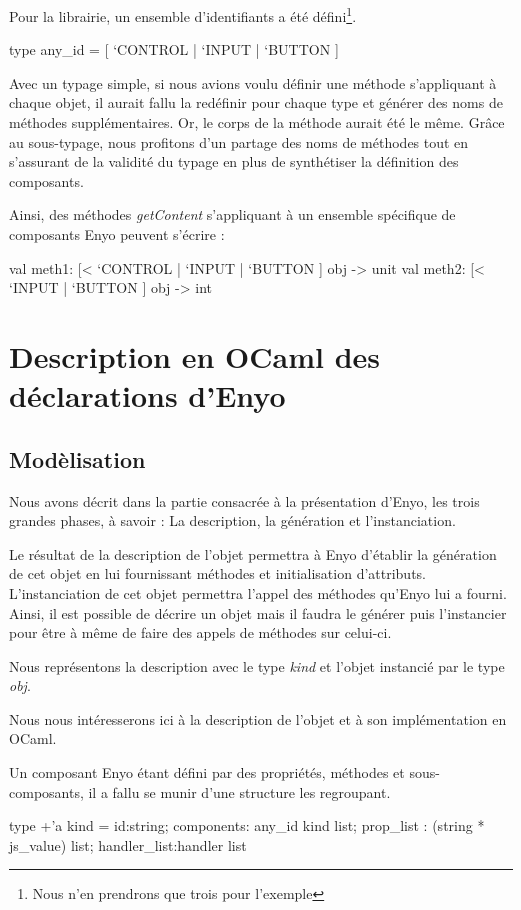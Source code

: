 \documentclass[11pt,a4paper]{report}
\begin{document}
Pour la librairie, un ensemble d'identifiants a été défini\footnote{Nous n'en prendrons que 
trois pour l'exemple}.

\begin{OCaml}
  type any_id = [ `CONTROL | `INPUT | `BUTTON ]
\end{OCaml}

Avec un typage simple, si nous avions voulu définir une méthode s'appliquant à chaque objet, il aurait
fallu la redéfinir pour chaque type et générer des noms de méthodes supplémentaires. 
Or, le corps de la méthode aurait été le même. 
Grâce au sous-typage, nous profitons d'un partage des noms de méthodes tout en s'assurant de la validité
du typage en plus de synthétiser la définition des composants.

Ainsi, des méthodes \emph{getContent} s'appliquant à un ensemble spécifique de composants Enyo
peuvent s'écrire :
\begin{OCaml}
  val meth1: [< `CONTROL | `INPUT | `BUTTON ] obj -> unit
  val meth2: [< `INPUT | `BUTTON ] obj -> int
\end{OCaml}

\section{Description en OCaml des déclarations d'Enyo}
\subsection{Modèlisation}

Nous avons décrit dans la partie consacrée à la présentation d'Enyo, les trois grandes phases, à savoir :
La description, la génération et l'instanciation.

Le résultat de la description de l'objet permettra à Enyo d'établir la génération de cet objet en lui
fournissant méthodes et initialisation d'attributs. L'instanciation de cet objet permettra l'appel
des méthodes qu'Enyo lui a fourni. Ainsi, il est possible de décrire un objet mais il faudra
le générer puis l'instancier pour être à même de faire des appels de méthodes sur celui-ci.

Nous représentons la description avec le type \emph{kind} et l'objet instancié par le type \emph{obj}.

Nous nous intéresserons ici à la description de l'objet et à son implémentation en OCaml.

Un composant Enyo étant défini par des propriétés, méthodes et sous-composants, il a fallu se munir
d'une structure les regroupant.
\begin{OCaml}
  type +'a kind = {id:string; 
                   components: any_id kind list; 
                   prop_list : (string * js_value) list;
                   handler_list:handler list
                  }
\end{OCaml}
\end{document}
